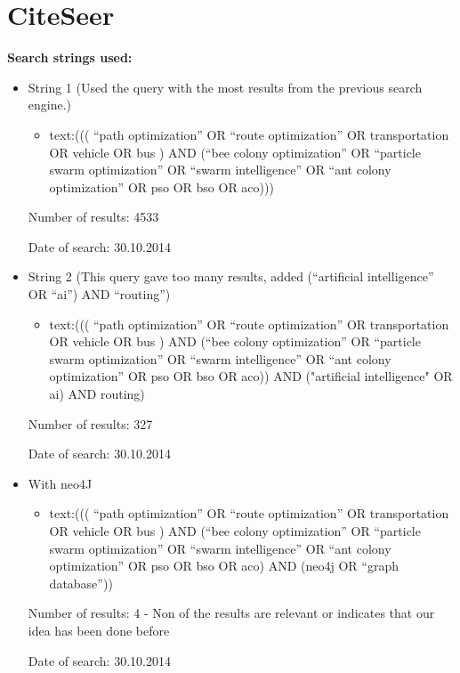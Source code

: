 \section{CiteSeer}
\textbf{Search strings used:}
\begin{itemize}
\item String 1 (Used the query with the most results from the previous search engine.)
\begin{itemize}
\item text:((( ``path optimization'' OR ``route optimization'' OR transportation OR vehicle OR bus ) AND (``bee colony optimization'' OR ``particle swarm optimization'' OR ``swarm intelligence'' OR ``ant colony optimization'' OR pso OR bso OR aco)))
\end{itemize}
\par
Number of results: 4533
\par
Date of search: 30.10.2014
\end{itemize}
\begin{itemize}
\item String 2 (This query gave too many results, added (``artificial intelligence'' OR ``ai'') AND ``routing'')
\begin{itemize}
\item text:((( ``path optimization'' OR ``route optimization'' OR transportation OR vehicle OR bus ) AND (``bee colony optimization'' OR ``particle swarm optimization'' OR ``swarm intelligence'' OR ``ant colony optimization'' OR pso OR bso OR aco)) AND ("artificial intelligence" OR ai) AND routing)
\end{itemize}
\par
Number of results: 327
\par
Date of search: 30.10.2014
\end{itemize}
\begin{itemize}
\item With neo4J
\begin{itemize}
\item text:((( ``path optimization'' OR ``route optimization'' OR transportation OR vehicle OR bus ) AND (``bee colony optimization'' OR ``particle swarm optimization'' OR ``swarm intelligence'' OR ``ant colony optimization'' OR pso OR bso OR aco) AND (neo4j OR ``graph database''))
\end{itemize}
\par
Number of results: 4 - Non of the results are relevant or indicates that our idea has been done before
\par
Date of search: 30.10.2014
\end{itemize}



